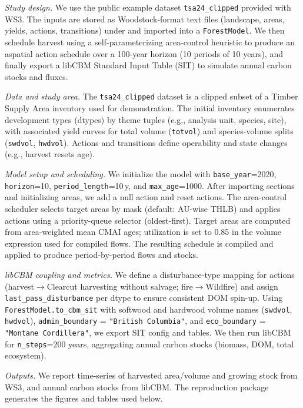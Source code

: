 \documentclass[review]{elsarticle}
\begin{document}
\emph{Study design.} We use the public example dataset \texttt{tsa24\_clipped} provided with WS3. The inputs are stored as Woodstock-format text files (landscape, areas, yields, actions, transitions) under  and imported into a \texttt{ForestModel}. We then schedule harvest using a self-parameterizing area-control heuristic to produce an aspatial action schedule over a 100-year horizon (10 periods of 10 years), and finally export a libCBM Standard Input Table (SIT) to simulate annual carbon stocks and fluxes.

\emph{Data and study area.} The \texttt{tsa24\_clipped} dataset is a clipped subset of a Timber Supply Area inventory used for demonstration. The initial inventory enumerates development types (dtypes) by theme tuples (e.g., analysis unit, species, site), with associated yield curves for total volume (\texttt{totvol}) and species-volume splits (\texttt{swdvol}, \texttt{hwdvol}). Actions and transitions define operability and state changes (e.g., harvest resets age).

\emph{Model setup and scheduling.} We initialize the model with \texttt{base\_year}=2020, \texttt{horizon}=10, \texttt{period\_length}=10\,y, and \texttt{max\_age}=1000. After importing sections and initializing areas, we add a null action and reset actions. The area-control scheduler selects target areas by mask (default: AU-wise THLB) and applies actions using a priority-queue selector (oldest-first). Target areas are computed from area-weighted mean CMAI ages; utilization is set to 0.85 in the volume expression used for compiled flows. The resulting schedule is compiled and applied to produce period-by-period flows and stocks.

\emph{libCBM coupling and metrics.} We define a disturbance-type mapping for actions (harvest$\to$Clearcut harvesting without salvage; fire$\to$Wildfire) and assign \texttt{last\_pass\_disturbance} per dtype to ensure consistent DOM spin-up. Using \texttt{ForestModel.to\_cbm\_sit} with softwood and hardwood volume names (\texttt{swdvol}, \texttt{hwdvol}), \texttt{admin\_boundary} = \texttt{"British Columbia"}, and \texttt{eco\_boundary} = \texttt{"Montane Cordillera"}, we export SIT config and tables. We then run libCBM for \texttt{n\_steps}=200 years, aggregating annual carbon stocks (biomass, DOM, total ecosystem).

\emph{Outputs.} We report time-series of harvested area/volume and growing stock from WS3, and annual carbon stocks from libCBM. The reproduction package generates the figures and tables used below.
\end{document}
